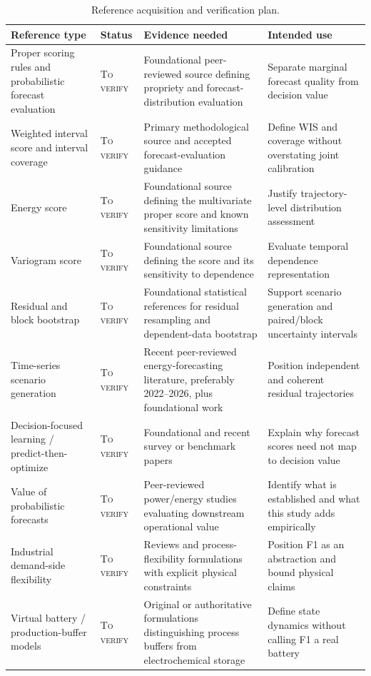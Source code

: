 \documentclass[10pt,twocolumn]{article}
\newcommand{\tverify}{\textsc{To verify}}
\begin{document}
\begin{table}[h]
\centering
\caption{Reference acquisition and verification plan.}
\small
\begin{tabularx}{\textwidth}{p{}p{}X X}
\toprule
Reference type & Status & Evidence needed & Intended use\\
\midrule
Proper scoring rules and probabilistic forecast evaluation & \tverify & Foundational peer-reviewed source defining propriety and forecast-distribution evaluation & Separate marginal forecast quality from decision value\\
Weighted interval score and interval coverage & \tverify & Primary methodological source and accepted forecast-evaluation guidance & Define WIS and coverage without overstating joint calibration\\
Energy score & \tverify & Foundational source defining the multivariate proper score and known sensitivity limitations & Justify trajectory-level distribution assessment\\
Variogram score & \tverify & Foundational source defining the score and its sensitivity to dependence & Evaluate temporal dependence representation\\
Residual and block bootstrap & \tverify & Foundational statistical references for residual resampling and dependent-data bootstrap & Support scenario generation and paired/block uncertainty intervals\\
Time-series scenario generation & \tverify & Recent peer-reviewed energy-forecasting literature, preferably 2022--2026, plus foundational work & Position independent and coherent residual trajectories\\
Decision-focused learning / predict-then-optimize & \tverify & Foundational and recent survey or benchmark papers & Explain why forecast scores need not map to decision value\\
Value of probabilistic forecasts & \tverify & Peer-reviewed power/energy studies evaluating downstream operational value & Identify what is established and what this study adds empirically\\
Industrial demand-side flexibility & \tverify & Reviews and process-flexibility formulations with explicit physical constraints & Position F1 as an abstraction and bound physical claims\\
Virtual battery / production-buffer models & \tverify & Original or authoritative formulations distinguishing process buffers from electrochemical storage & Define state dynamics without calling F1 a real battery\\

\end{tabularx}
\end{table}
\end{document}
